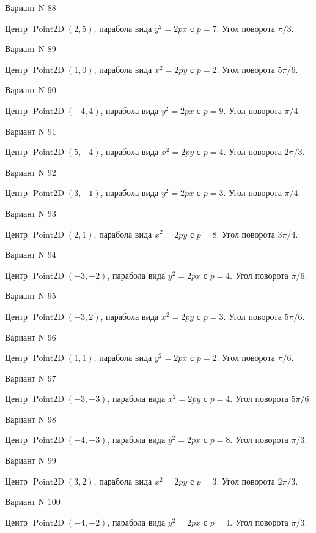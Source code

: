 \documentclass[11pt]{report}
\begin{document}
Вариант N 88

Центр $\operatorname{Point2D}\left(2, 5\right)$, парабола вида $y^{2} = 2px$ с $p = 7$. Угол поворота $\pi / 3$.

Вариант N 89

Центр $\operatorname{Point2D}\left(1, 0\right)$, парабола вида $x^{2} = 2py$ с $p = 2$. Угол поворота $5 \pi / 6$.

Вариант N 90

Центр $\operatorname{Point2D}\left(-4, 4\right)$, парабола вида $y^{2} = 2px$ с $p = 9$. Угол поворота $\pi / 4$.

Вариант N 91

Центр $\operatorname{Point2D}\left(5, -4\right)$, парабола вида $x^{2} = 2py$ с $p = 4$. Угол поворота $2 \pi / 3$.

Вариант N 92

Центр $\operatorname{Point2D}\left(3, -1\right)$, парабола вида $y^{2} = 2px$ с $p = 3$. Угол поворота $\pi / 4$.

Вариант N 93

Центр $\operatorname{Point2D}\left(2, 1\right)$, парабола вида $x^{2} = 2py$ с $p = 8$. Угол поворота $3 \pi / 4$.

Вариант N 94

Центр $\operatorname{Point2D}\left(-3, -2\right)$, парабола вида $y^{2} = 2px$ с $p = 4$. Угол поворота $\pi / 6$.

Вариант N 95

Центр $\operatorname{Point2D}\left(-3, 2\right)$, парабола вида $x^{2} = 2py$ с $p = 3$. Угол поворота $5 \pi / 6$.

Вариант N 96

Центр $\operatorname{Point2D}\left(1, 1\right)$, парабола вида $y^{2} = 2px$ с $p = 2$. Угол поворота $\pi / 6$.

Вариант N 97

Центр $\operatorname{Point2D}\left(-3, -3\right)$, парабола вида $x^{2} = 2py$ с $p = 4$. Угол поворота $5 \pi / 6$.

Вариант N 98

Центр $\operatorname{Point2D}\left(-4, -3\right)$, парабола вида $y^{2} = 2px$ с $p = 8$. Угол поворота $\pi / 3$.

Вариант N 99

Центр $\operatorname{Point2D}\left(3, 2\right)$, парабола вида $x^{2} = 2py$ с $p = 3$. Угол поворота $2 \pi / 3$.

Вариант N 100

Центр $\operatorname{Point2D}\left(-4, -2\right)$, парабола вида $y^{2} = 2px$ с $p = 4$. Угол поворота $\pi / 3$.
\end{document}
